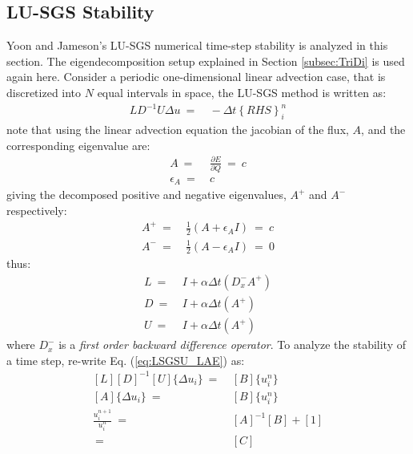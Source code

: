 \documentclass[conf]{new-aiaa}
\begin{document}
\subsection{LU-SGS Stability}
\label{subsec:LUSGS}
Yoon and Jameson's LU-SGS numerical time-step stability is analyzed in this section. The eigendecomposition setup explained in Section \ref{subsec:TriDi} is used again here.
Consider a periodic one-dimensional linear advection case, that is discretized into $N$ equal intervals in space, the LU-SGS method is written as:
\begin{equation}
	\begin{split}
	\label{eq:LSGSU_LAE}
		LD^{-1}U\Delta{u}~=&~-\Delta{t}\left\{RHS\right\}^{n}_i
	\end{split}
\end{equation}
note that using the linear advection equation the jacobian of the flux, $A$, and the corresponding eigenvalue are:
\begin{equation}
	\begin{split}
		\label{eq:FluxJac_Eig}
  			A~=&~\frac{\partial{E}}{\partial{Q}}~=~c \\
  			\epsilon_A~=&~c
	\end{split}
\end{equation}
giving the decomposed positive and negative eigenvalues, $A^+$ and $A^-$ respectively:
\begin{equation}
	\begin{split}
		\label{eq:A_Plus_Minus}
  			A^{+}~=&~\frac{1}{2}\left(A+\epsilon_AI\right)~=~c \\
  			A^{-}~=&~\frac{1}{2}\left(A-\epsilon_AI\right)~=~0
	\end{split}
\end{equation}
thus:
\begin{equation}
	\label{eq:LDU}
	\begin{split}
            L~=&~I + \alpha\Delta{t}\left(D_x^-A^+\right)\\
		D~=&~I + \alpha\Delta{t}\left(A^+\right) \\
		U~=&~I + \alpha\Delta{t}\left(A^+\right)
	\end{split}
\end{equation}
where $D_x^-$ is a \textit{first order backward difference operator}.  
To analyze the stability of a time step, re-write Eq. (\ref{eq:LSGSU_LAE}) as:
\begin{equation}
\label{eq:AB}
	\begin{split}
  		[L][D]^{-1}[U]\{\Delta{u_i\}}~=&~[B]\{u_i^{n}\} \\
  		[A]\{\Delta{u_i\}}~=&~[B]\{u_i^{n}\} \\
  		\frac{u_i^{n+1}}{u_i^{n}}~=&~[A]^{-1}[B] + [1] \\
  		~=&~[C]
	\end{split}
\end{equation}
\end{document}
